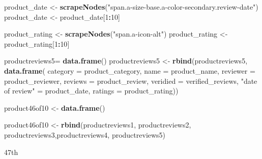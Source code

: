 \documentclass[
]{article}
\newenvironment{Shaded}{\begin{snugshade}}{\end{snugshade}}
\newcommand{\AttributeTok}[1]{\textcolor[rgb]{0.13,0.29,0.53}{#1}}
\newcommand{\DecValTok}[1]{\textcolor[rgb]{0.00,0.00,0.81}{#1}}
\newcommand{\FunctionTok}[1]{\textcolor[rgb]{0.13,0.29,0.53}{\textbf{#1}}}
\newcommand{\NormalTok}[1]{#1}
\newcommand{\OtherTok}[1]{\textcolor[rgb]{0.56,0.35,0.01}{#1}}
\newcommand{\SpecialCharTok}[1]{\textcolor[rgb]{0.81,0.36,0.00}{\textbf{#1}}}
\newcommand{\StringTok}[1]{\textcolor[rgb]{0.31,0.60,0.02}{#1}}
\begin{document}
\begin{Shaded}
\begin{Highlighting}[]
\NormalTok{  product\_date }\OtherTok{\textless{}{-}} \FunctionTok{scrapeNodes}\NormalTok{(}\StringTok{"span.a{-}size{-}base.a{-}color{-}secondary.review{-}date"}\NormalTok{)}
\NormalTok{  product\_date }\OtherTok{\textless{}{-}}\NormalTok{ product\_date[}\DecValTok{1}\SpecialCharTok{:}\DecValTok{10}\NormalTok{]}
  
\NormalTok{  product\_rating }\OtherTok{\textless{}{-}} \FunctionTok{scrapeNodes}\NormalTok{(}\StringTok{"span.a{-}icon{-}alt"}\NormalTok{)}
\NormalTok{  product\_rating }\OtherTok{\textless{}{-}}\NormalTok{ product\_rating[}\DecValTok{1}\SpecialCharTok{:}\DecValTok{10}\NormalTok{]}
  
\NormalTok{  productreviews5}\OtherTok{=} \FunctionTok{data.frame}\NormalTok{()}
\NormalTok{  productreviews5 }\OtherTok{\textless{}{-}} \FunctionTok{rbind}\NormalTok{(productreviews5, }\FunctionTok{data.frame}\NormalTok{(}
                      \AttributeTok{category =}\NormalTok{ product\_category,}
                      \AttributeTok{name =}\NormalTok{ product\_name,}
                      \AttributeTok{reviewer =}\NormalTok{ product\_reviewer,}
                      \AttributeTok{reviews =}\NormalTok{ product\_review,}
                      \AttributeTok{veridied =}\NormalTok{ verified\_reviews,}
                      \StringTok{"date of review"} \OtherTok{=}\NormalTok{ product\_date,}
                      \AttributeTok{ratings =}\NormalTok{ product\_rating))}
  
\NormalTok{  product46of10 }\OtherTok{\textless{}{-}} \FunctionTok{data.frame}\NormalTok{()}
  
\NormalTok{  product46of10 }\OtherTok{\textless{}{-}} \FunctionTok{rbind}\NormalTok{(productreviews1, productreviews2, productreviews3,productreviews4, productreviews5)}
\end{Highlighting}
\end{Shaded}

47th
\end{document}
